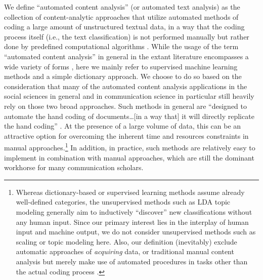 \documentclass[man, 12pt, a4paper, nolmodern, noextraspace]{apa6}
\begin{document}
    We define \enquote{automated content analysis} (or automated text analysis) as the collection of content-analytic approaches that utilize automated methods of coding a large amount of unstructured textual data, in a way that the coding process itself (i.e., the text classification) is not performed manually but rather done by predefined computational algorithms \parencite{trilling2018scaling, grimmer2013text}. While the usage of the term \enquote{automated content analysis} in general in the extant literature encompasses a wide variety of forms \parencites[e.g.,][]{riff2014analyzing, Hopkins_King2010, Krippendorff2013, grimmer2013text}, here we mainly refer to supervised machine learning methods and a simple dictionary approach. We choose to do so based on the consideration that many of the automated content analysis applications in the social sciences in general and in communication science in particular still heavily rely on those two broad approaches. Such methods in general are \enquote{designed to automate the hand coding of documents\ldots[in a way that] it will directly replicate the hand coding} \parencites[][p. 13]{grimmer2013text}. At the presence of a large volume of data, this can be an attractive option for overcoming the inherent time and resources constraints in manual approaches.\footnote{Whereas  dictionary-based or supervised learning methods assume already well-defined categories, the unsupervised methods such as LDA topic modeling \parencites[][]{dimaggio2013exploiting, maier2018applying} generally aim to inductively \enquote{discover} new classifications without any human input. Since our primary interest lies in the interplay of human input and machine output, we do not consider unsupervised methods such as scaling or topic modeling here. Also, our definition (inevitably) exclude automatic approaches of \textit{acquiring} data, or traditional manual content analysis but merely make use of automated procedures in tasks other than the actual coding process \parencites[such as in data entry or data management: e.g.,][]{lewis2013content}.} In addition, in practice, such methods are relatively easy to implement in combination with manual approaches, which are still the dominant workhorse for many communication scholars.
    
\end{document}
